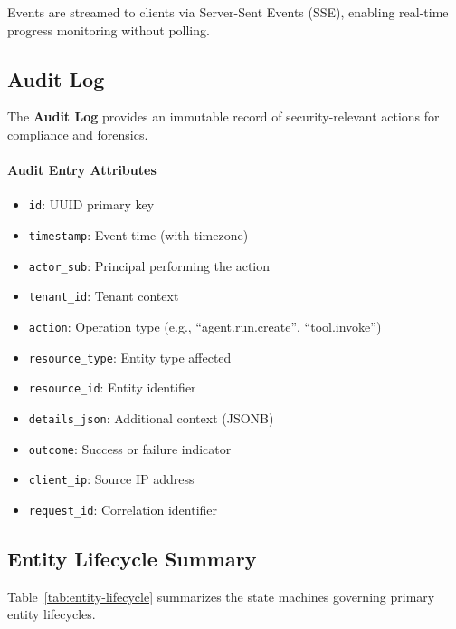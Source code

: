 Events are streamed to clients via Server-Sent Events (SSE), enabling real-time progress monitoring without polling.

\subsection{Audit Log}

The \textbf{Audit Log} provides an immutable record of security-relevant actions for compliance and forensics.

\paragraph{Audit Entry Attributes}
\begin{itemize}
    \item \texttt{id}: UUID primary key
    \item \texttt{timestamp}: Event time (with timezone)
    \item \texttt{actor\_sub}: Principal performing the action
    \item \texttt{tenant\_id}: Tenant context
    \item \texttt{action}: Operation type (e.g., ``agent.run.create'', ``tool.invoke'')
    \item \texttt{resource\_type}: Entity type affected
    \item \texttt{resource\_id}: Entity identifier
    \item \texttt{details\_json}: Additional context (JSONB)
    \item \texttt{outcome}: Success or failure indicator
    \item \texttt{client\_ip}: Source IP address
    \item \texttt{request\_id}: Correlation identifier
\end{itemize}

\subsection{Entity Lifecycle Summary}

Table~\ref{tab:entity-lifecycle} summarizes the state machines governing primary entity lifecycles.

